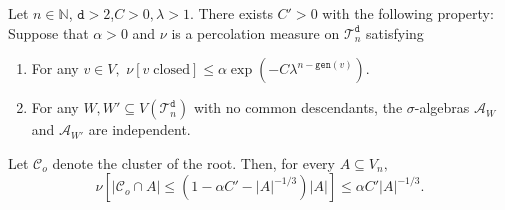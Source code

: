 \documentclass[10pt,a4paper]{amsart}
\begin{document}
\begin{lemma} \label{lemma:Big_Bad_Tree_lemma} Let $n\in \mathbb{N}$, $\mathtt{d}> 2$,$C>0, \lambda >1.$ There exists $C'>0$ with the following property: Suppose that $\alpha>0$ and $\nu$ is a percolation measure  on $\mathscr{T}_n^\mathtt{d}$ satisfying \begin{enumerate}
    \item[$i)$] For any $v\in V,$ 
    $
    \nu[v\;\mathrm{ closed}]\leq \alpha \exp\left(-C \lambda^{
    n-\mathtt{gen}(v)}\right).
    $
    \item[$ii)$] For any $W,W'\subseteq V(\mathscr{T}_n^\mathtt{d})$ with no common descendants, the $\sigma$-algebras $\mathcal{A}_{W}$ and $\mathcal{A}_{W'}$ are independent.
\end{enumerate}
Let $\mathcal{C}_o$ denote the cluster of the root.  Then, for every $A\subseteq V_n,$ 
$$
\nu[|\mathcal{C}_o \cap A|\leq (1-\alpha C'-|A|^{-1/3}) |A| ]\leq \alpha C'|A|^{-1/3}.
$$
\end{lemma}
\end{document}
